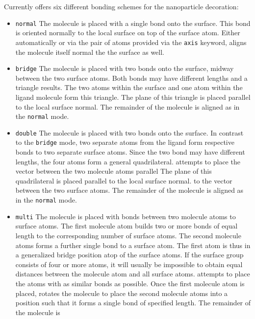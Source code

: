 Currently \Discus offers six different bonding schemes for the 
nanoparticle decoration:
\begin{itemize}
\item {\tt normal} The molecule is placed with a single bond onto the
      surface. This bond is oriented normally to the local surface
      on top of the surface atom.
      Either automatically or via the pair of atoms provided via the
      {\tt axis} keyword, \Discus aligns the molecule itself normal
      the the surface as well.
\item {\tt bridge} The molecule is placed with two bonds onto the
      surface, midway between the two surface atoms. Both bonds 
      may have different lengths and a triangle results. The 
      two atoms within the surface and one atom within the ligand
      molecule form this triangle.
      The plane of this triangle is placed parallel to the local 
      surface normal.
      The remainder of the molecule is 
      aligned as in the {\tt normal} mode.
\item {\tt double} The molecule is placed with two bonds onto the
      surface. In contrast to the {\tt bridge} mode, two separate
      atoms from the ligand form respective bonds to two separate 
      surface atoms. Since the two bond may have different lengths, 
      the four atoms form a general quadrilateral. \Discus attempts
      to place the vector between the two molecule atoms parallel
      The plane of this quadrilateral is placed parallel to the local 
      surface normal.
      to the vector between the two surface atoms.
      The remainder of the molecule is 
      aligned as in the {\tt normal} mode.
\item {\tt multi} The molecule is placed with bonds between two
      molecule atoms to surface atoms. The first molecule atom
      builds two or more bonds of equal length to the corresponding
      number of surface atoms. The second molecule atoms forms a
      further single bond to a surface atom. The first atom is thus 
      in a generalized bridge position atop of the surface atoms. 
      If the surface group consists of four or more atoms, it will
      usually be impossible to obtain equal distances between the 
      molecule atom and all surface atoms. \Discus attempts to 
      place the atoms with as similar bonds as possible. Once the
      first molecule atom is placed, \Discus rotates the molecule
      to place the second molecule atoms into a position such 
      that it forms a single bond of specified length.
      The remainder of the molecule is 

\end{itemize}
